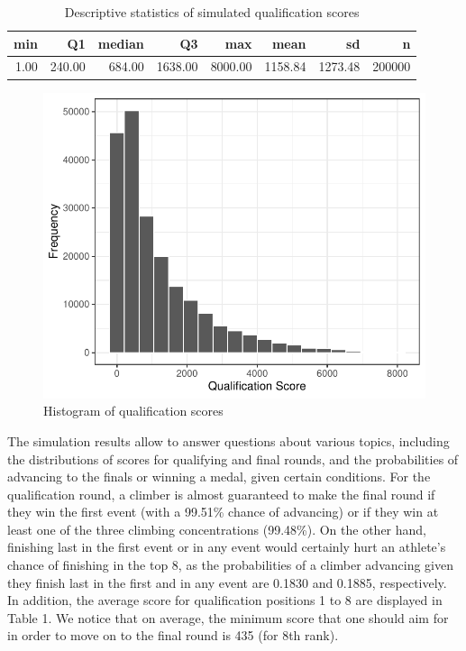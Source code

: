 \documentclass[12pt]{article}
\begin{document}
\begin{table}[ht]
\centering
\caption{Descriptive statistics of simulated qualification scores} 
\begin{tabular}{rrrrrrrr}
  \hline
min & Q1 & median & Q3 & max & mean & sd & n \\ 
  \hline
1.00 & 240.00 & 684.00 & 1638.00 & 8000.00 & 1158.84 & 1273.48 & 200000 \\ 
   \hline
\end{tabular}
\end{table}

\begin{figure}[H]
\centering
\includegraphics{draft_files/figure-latex/unnamed-chunk-5-1.pdf}
\caption{Histogram of qualification scores}
\end{figure}

The simulation results allow to answer questions about various topics,
including the distributions of scores for qualifying and final rounds,
and the probabilities of advancing to the finals or winning a medal,
given certain conditions. For the qualification round, a climber is
almost guaranteed to make the final round if they win the first event
(with a 99.51\% chance of advancing) or if they win at least one of the
three climbing concentrations (99.48\%). On the other hand, finishing
last in the first event or in any event would certainly hurt an
athlete's chance of finishing in the top 8, as the probabilities of a
climber advancing given they finish last in the first and in any event
are 0.1830 and 0.1885, respectively. In addition, the average score for
qualification positions 1 to 8 are displayed in Table 1. We notice that
on average, the minimum score that one should aim for in order to move
on to the final round is 435 (for 8th rank).
\end{document}
